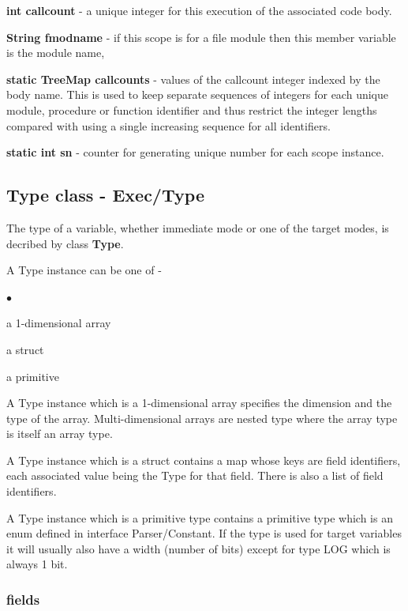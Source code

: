 \documentclass[10pt,a4paper,twoside,fleqn]{book}
\newcommand{\blist}{\begin{list}{$\bullet$}{\setlength{\itemsep}{-5pt}\setlength{\topsep}{-5pt}}}
\newcommand{\blend}{\end{list}}
\begin{document}
            {\bf int callcount} - a unique integer for this execution of the
            associated code body.

            {\bf String fmodname} - if this scope is for a file module then this
            member variable is the module name,

            {\bf static TreeMap callcounts} - values of the callcount integer
            indexed by the body name. This is used to keep separate sequences of
            integers for each unique module, procedure or function identifier
            and thus restrict the integer lengths compared with using a single
            increasing sequence for all identifiers.
            
            {\bf static int sn} - counter for generating unique number for each scope
            instance.


        
        \subsection{Type class - Exec/Type}\label{type}

            The type of a variable, whether immediate mode or one of the target modes,
            is decribed by class {\bf Type}.

            A Type instance can be one of -
            \blist
            \item   a 1-dimensional array
            \item   a struct
            \item   a primitive
            \blend

            A Type instance which is a 1-dimensional array specifies
            the dimension and the type of the array. Multi-dimensional arrays
            are nested type where the array type is itself an array type.

            A Type instance which is a struct contains a map whose
            keys are field identifiers, each associated value being
            the Type for that field. There is also a list of field identifiers.

            A Type instance which is a primitive type contains a primitive type
            which is an enum defined in interface Parser/Constant. If the type is
            used for target variables it will usually also have a width (number of
            bits) except for type LOG which is always 1 bit.

            \subsubsection{fields}
\end{document}
